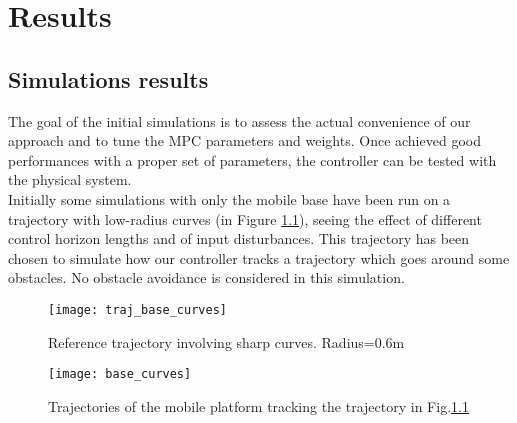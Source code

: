 
\chapter{Results}
\label{chapter7}
\section{Simulations results}
The goal of the initial simulations is to assess the actual convenience of our approach and to tune the MPC parameters and weights. Once achieved good performances with a proper set of parameters, the controller can be tested with the physical system.\\
Initially some simulations with only the mobile base have been run on a trajectory with low-radius curves (in Figure \ref{traj_base_curves}), seeing the effect of different control horizon lengths and of input disturbances. This trajectory has been chosen to simulate how our controller tracks a trajectory which goes around some obstacles. No obstacle avoidance is considered in this simulation.
\begin{figure}%
\centering
\texttt{[image: traj\_base\_curves]}
\caption{Reference trajectory involving sharp curves. Radius=0.6m}
\label{traj_base_curves}
\end{figure}
\begin{figure}
\centering
\texttt{[image: base\_curves]}
\caption{Trajectories of the mobile platform tracking the trajectory in Fig.\ref{traj_base_curves}}
\label{base_curves}
\end{figure}

